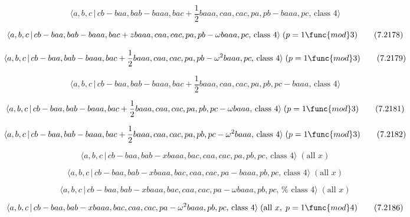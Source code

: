 \documentclass[10pt]{article}
\begin{document}
\begin{equation}
\langle a,b,c\,|\,cb-baa,bab-baaa,bac+\frac{1}{2}baaa,caa,cac,pa,pb-baaa,pc,%
\,\text{class }4\rangle  \tag{7.2177}
\end{equation}

\begin{equation}
\langle a,b,c\,|\,cb-baa,bab-baaa,bac+zbaaa,caa,cac,pa,pb-\omega baaa,pc,\,%
\text{class }4\rangle \;(p=1\func{mod}3)  \tag{7.2178}
\end{equation}

\begin{equation}
\langle a,b,c\,|\,cb-baa,bab-baaa,bac+\frac{1}{2}baaa,caa,cac,pa,pb-\omega
^{2}baaa,pc,\,\text{class }4\rangle \;(p=1\func{mod}3)  \tag{7.2179}
\end{equation}

\begin{equation}
\langle a,b,c\,|\,cb-baa,bab-baaa,bac+\frac{1}{2}baaa,caa,cac,pa,pb,pc-baaa,%
\,\text{class }4\rangle  \tag{7.2180}
\end{equation}

\begin{equation}
\langle a,b,c\,|\,cb-baa,bab-baaa,bac+\frac{1}{2}baaa,caa,cac,pa,pb,pc-%
\omega baaa,\,\text{class }4\rangle \;(p=1\func{mod}3)  \tag{7.2181}
\end{equation}

\begin{equation}
\langle a,b,c\,|\,cb-baa,bab-baaa,bac+\frac{1}{2}baaa,caa,cac,pa,pb,pc-%
\omega ^{2}baaa,\,\text{class }4\rangle \;(p=1\func{mod}3)  \tag{7.2182}
\end{equation}

\begin{equation}
\langle a,b,c\,|\,cb-baa,bab-xbaaa,bac,caa,cac,pa,pb,pc,\,\text{class }%
4\rangle \;(\text{all }x)  \tag{7.2183}
\end{equation}

\begin{equation}
\langle a,b,c\,|\,cb-baa,bab-xbaaa,bac,caa,cac,pa-baaa,pb,pc,\,\text{class }%
4\rangle \;(\text{all }x)  \tag{7.2184}
\end{equation}

\begin{equation}
\langle a,b,c\,|\,cb-baa,bab-xbaaa,bac,caa,cac,pa-\omega baaa,pb,pc,\,\text{%
class }4\rangle \;(\text{all }x)  \tag{7.2185}
\end{equation}

\begin{equation}
\langle a,b,c\,|\,cb-baa,bab-xbaaa,bac,caa,cac,pa-\omega ^{2}baaa,pb,pc,\,%
\text{class }4\rangle \;(\text{all }x,\;p=1\func{mod}4)  \tag{7.2186}
\end{equation}
\end{document}
